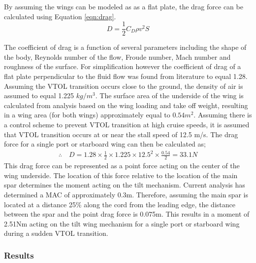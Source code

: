 By assuming the wings can be modeled as as a flat plate, the drag force can be calculated using Equation \ref{eqn:drag}.
\begin{equation}
    D=\frac{1}{2}C_D\rho v^2S \label{eqn:drag}
\end{equation}

The coefficient of drag is a function of several parameters including the shape of the body, Reynolds number of the flow, Froude number, Mach number and roughness of the surface. For simplification however the coefficient of drag of a flat plate perpendicular to the fluid flow was found from literature to equal 1.28. Assuming the VTOL transition occurs close to the ground, the density of air is assumed to equal 1.225 \(kg/m^3\). The surface area of the underside of the wing is calculated from analysis based on the wing loading and take off weight, resulting in a wing area (for both wings) approximately equal to \(0.54 m^2\). Assuming there is a control scheme to prevent VTOL transition at high cruise speeds, it is assumed that VTOL transition occurs at or near the stall speed of 12.5 m/s. The drag force for a single port or starboard wing can then be calculated as;
\begin{gather*}
    \therefore\quad D=1.28\times \frac{1}{2}\times 1.225\times 12.5^2\times \frac{0.54}{2} = 33.1 N
\end{gather*}
This drag force can be represented as a point force acting on the center of the wing underside. The location of this force relative to the location of the main spar determines the moment acting on the tilt mechanism. Current analysis has determined a MAC of approximately 0.3m. Therefore, assuming the main spar is located at a distance 25\% along the cord from the leading edge, the distance between the spar and the point drag force is 0.075m. This results in a moment of 2.51Nm acting on the tilt wing mechanism for a single port or starboard wing during a sudden VTOL transition. 

\subsubsection{Results} 
